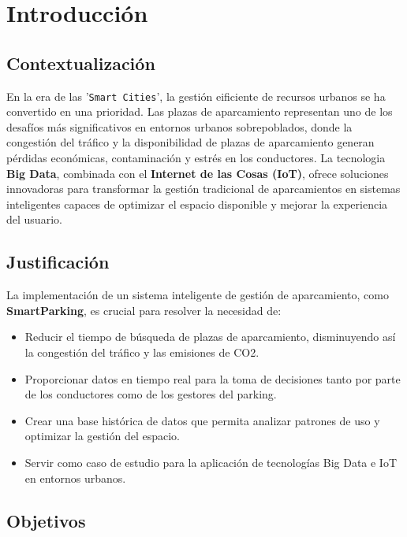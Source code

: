 \documentclass{../../../miPlantilla}
\begin{document}
\maketitle

\section{Introducción}
\subsection{Contextualización}
En la era de las '\texttt{Smart Cities}', la gestión eificiente de recursos urbanos se ha convertido en una prioridad.
Las plazas de aparcamiento representan uno de los desafíos más significativos en entornos urbanos sobrepoblados, donde 
la congestión del tráfico y la disponibilidad de plazas de aparcamiento generan pérdidas económicas, contaminación y 
estrés en los conductores. La tecnologia \textbf{Big Data}, combinada con el \textbf{Internet de las Cosas (IoT)},
ofrece soluciones innovadoras para transformar la gestión tradicional de aparcamientos en sistemas inteligentes
capaces de optimizar el espacio disponible y mejorar la experiencia del usuario.

\subsection{Justificación}
La implementación de un sistema inteligente de gestión de aparcamiento, como \textbf{SmartParking}, es crucial para
resolver la necesidad de:

\begin{itemize}
  \item Reducir el tiempo de búsqueda de plazas de aparcamiento, disminuyendo así la congestión del tráfico y
        las emisiones de CO2.
  \item Proporcionar datos en tiempo real para la toma de decisiones tanto por parte de los conductores como de los
        gestores del parking.
  \item Crear una base histórica de datos que permita analizar patrones de uso y optimizar la gestión del espacio.
  \item Servir como caso de estudio para la aplicación de tecnologías Big Data e IoT en entornos urbanos.
\end{itemize}

\subsection{Objetivos}
\end{document}
